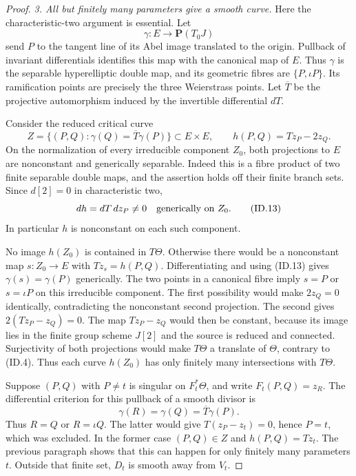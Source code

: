 \documentclass[11pt,a4paper]{article}
\begin{document}
\begin{proof}
\emph{3. All but finitely many parameters give a smooth curve.}
Here the characteristic-two argument is essential. Let
\[
                \gamma:E\longrightarrow\mathbf P(T_0J)
 \tag{ID.11}
\]
send $P$ to the tangent line of its Abel image translated
to the origin. Pullback of invariant differentials identifies
this map with the canonical map of $E$. Thus $\gamma$ is the
separable hyperelliptic double map, and its geometric fibres
are $\{P,\iota P\}$. Its ramification points are precisely
the three Weierstrass points. Let $\overline T$ be the
projective automorphism induced by the invertible differential
$dT$.

Consider the reduced critical curve
\[
 Z=\{(P,Q):\gamma(Q)=\overline T\gamma(P)\}
             \subset E\times E,
 \qquad h(P,Q)=Tz_P-2z_Q.
 \tag{ID.12}
\]
On the normalization of every irreducible component $Z_0$,
both projections to $E$ are nonconstant and generically
separable. Indeed this is a fibre product of two finite
separable double maps, and the assertion holds off their
finite branch sets. Since $d[2]=0$ in characteristic two,
\[
                         dh=dT\,dz_P\ne0
                         \quad\hbox{generically on }Z_0.
 \tag{ID.13}
\]
In particular $h$ is nonconstant on each such component.

No image $h(Z_0)$ is contained in $T\Theta$. Otherwise
there would be a nonconstant map $s:Z_0\to E$ with
$Tz_s=h(P,Q)$. Differentiating and using (ID.13) gives
$\gamma(s)=\gamma(P)$ generically. The two points in a
canonical fibre imply $s=P$ or $s=\iota P$ on this
irreducible component. The first possibility would make
$2z_Q=0$ identically, contradicting the nonconstant second
projection. The second gives
$2(Tz_P-z_Q)=0$. The map $Tz_P-z_Q$ would then be constant,
because its image lies in the finite group scheme $J[2]$
and the source is reduced and connected. Surjectivity of
both projections would make $T\Theta$ a translate of
$\Theta$, contrary to (ID.4). Thus each curve $h(Z_0)$
has only finitely many intersections with $T\Theta$.

Suppose $(P,Q)$ with $P\ne t$ is singular on $F_t^*\Theta$,
and write $F_t(P,Q)=z_R$. The differential criterion for
this pullback of a smooth divisor is
\[
                    \gamma(R)=\gamma(Q)=\overline T\gamma(P).
 \tag{ID.14}
\]
Thus $R=Q$ or $R=\iota Q$. The latter would give
$T(z_P-z_t)=0$, hence $P=t$, which was excluded. In the
former case $(P,Q)\in Z$ and $h(P,Q)=Tz_t$.
The previous paragraph shows that this can happen for only
finitely many parameters $t$. Outside that finite set,
$D_t$ is smooth away from $V_t$.


\end{proof}
\end{document}

